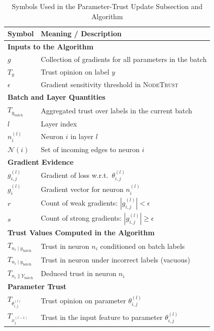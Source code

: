 \begin{table}[H]
\centering
\caption{Symbols Used in the Parameter-Trust Update Subsection and Algorithm}
\label{tab:params-algorithm-append}
\renewcommand{\arraystretch}{1.2}
\begin{tabular}{ll}
\hline
\textbf{Symbol} & \textbf{Meaning / Description} \\
\hline
\multicolumn{2}{l}{\textbf{Inputs to the Algorithm}} \\
$g$ & Collection of gradients for all parameters in the batch \\
$T_y$ & Trust opinion on label $y$ \\
$\epsilon$ & Gradient sensitivity threshold in \textsc{NodeTrust} \\[4pt]

\multicolumn{2}{l}{\textbf{Batch and Layer Quantities}} \\
$T_{y_{\text{batch}}}$ & Aggregated trust over labels in the current batch \\
$l$ & Layer index \\
$n_i^{(l)}$ & Neuron $i$ in layer $l$ \\
$\mathcal{N}(i)$ & Set of incoming edges to neuron $i$ \\[4pt]

\multicolumn{2}{l}{\textbf{Gradient Evidence}} \\
$g^{(l)}_{i,j}$ & Gradient of loss w.r.t.\ $\theta^{(l)}_{i,j}$ \\
$g^{(l)}_{i}$ & Gradient vector for neuron $n_i^{(l)}$ \\
$r$ & Count of weak gradients: $|g^{(l)}_{i,j}| < \epsilon$ \\
$s$ & Count of strong gradients: $|g^{(l)}_{i,j}| \ge \epsilon$ \\[4pt]

\multicolumn{2}{l}{\textbf{Trust Values Computed in the Algorithm}} \\
$T_{n_i \mid y_{\text{batch}}}$ & Trust in neuron $n_i$ conditioned on batch labels \\
$T_{n_i \mid \overline{y_{\text{batch}}}}$ & Trust in neuron under incorrect labels (vacuous) \\
$T_{n_i \parallel Y_{\text{batch}}}$ & Deduced trust in neuron $n_i$ \\[4pt]

\multicolumn{2}{l}{\textbf{Parameter Trust}} \\
$T_{\theta^{(l)}_{i,j}}$ & Trust opinion on parameter $\theta^{(l)}_{i,j}$ \\
$T_{x^{(l-1)}_j}$ & Trust in the input feature to parameter $\theta^{(l)}_{i,j}$ \\[4pt]


\end{tabular}
\end{table}
